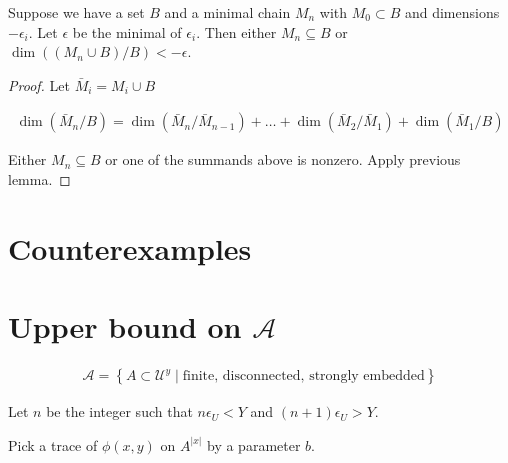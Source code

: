 \documentclass{amsart}
\renewcommand{\AA}{\mathscr A}
\newcommand{\U}{\mathcal U}
\newcommand{\curly}[1]{\left\{#1\right\}}
\begin{document}
\begin{Lemma}	\label{chain_lemma}
	Suppose we have a set $B$ and a minimal chain $M_n$ with $M_0 \subset B$ and dimensions $-\epsilon_i$.
Let $\epsilon$ be the minimal of $\epsilon_i$.
Then either $M_n \subseteq B$ or $\dim((M_n \cup B)/B) < -\epsilon$.
\end{Lemma}


\begin{proof}
	Let $\bar M_i = M_i \cup B$

	\begin{align*}
		\dim(\bar M_n/B) = \dim(\bar M_n/\bar M_{n-1}) + \ldots + \dim(\bar M_2/\bar M_1) + \dim(\bar M_1/B)
	\end{align*}

	Either $M_n \subseteq B$ or one of the summands above is nonzero.
	Apply previous lemma.
\end{proof}

\section{Counterexamples}



\section{Upper bound on $\AA$}

\begin{Definition}
	\begin{align*}
		\AA = \curly{A \subset \U^{y} \mid \text{finite, disconnected, strongly embedded}}
	\end{align*}
\end{Definition}

Let $n$ be the integer such that $n \epsilon_U < Y$ and $(n+1) \epsilon_U > Y$.

Pick a trace of $\phi(x,y)$ on $A^{|x|}$ by a parameter $b$.
\end{document}
